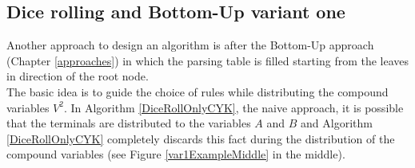 \pagebreak
\clearpage
\subsection{Dice rolling and Bottom-Up variant one} \label{var1}
Another approach to design an algorithm is after the Bottom-Up approach (Chapter \ref{approaches}) in which the parsing table is filled starting from the leaves in direction of the root node.\\
The basic idea is to guide the choice of rules while distributing the compound variables $V^2$. In Algorithm \ref{DiceRollOnlyCYK}, the naive approach, it is possible that the terminals are distributed to the variables $A$ and $B$ and Algorithm \ref{DiceRollOnlyCYK} completely discards this fact during the distribution of the compound variables (see Figure \ref{var1ExampleMiddle} in the middle). \\

